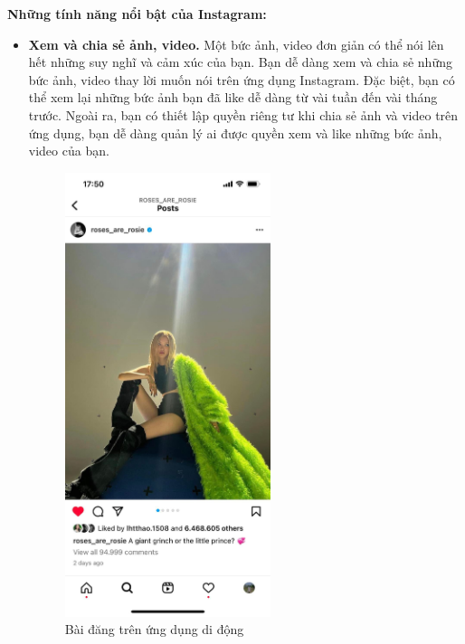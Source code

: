 \newpage
\textbf{Những tính năng nổi bật của Instagram:}
\begin{itemize}
    \item \textbf{Xem và chia sẻ ảnh, video.} Một bức ảnh, video đơn giản có thể nói lên hết những suy nghĩ và cảm xúc của bạn. Bạn dễ dàng xem và chia sẻ những bức ảnh, video thay lời muốn nói trên ứng dụng Instagram. Đặc biệt, bạn có thể xem lại những bức ảnh bạn đã like dễ dàng từ vài tuần đến vài tháng trước. Ngoài ra, bạn có thiết lập quyền riêng tư khi chia sẻ ảnh và video trên ứng dụng, bạn dễ dàng quản lý ai được quyền xem và like những bức ảnh, video của bạn.\par
    \begin{figure}[h!]
        \centering
        \includegraphics[width=6cm]{Images/chapter 2/instagram/post_app.jpg}
        \caption{Bài đăng trên ứng dụng di động}
        \label{fig:my_label}
    \end{figure}
  

\end{itemize}
